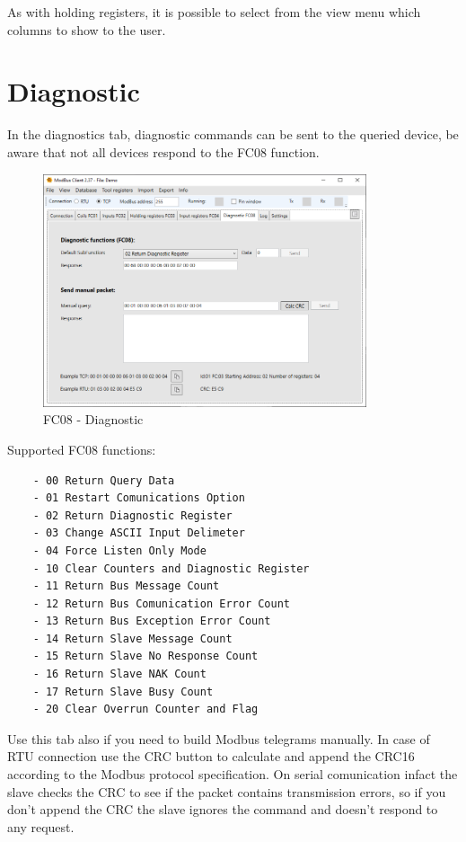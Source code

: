 As with holding registers, it is possible to select from the view menu 
which columns to show to the user.

\newpage
\section{Diagnostic}

In the diagnostics tab, diagnostic commands can be sent to the queried device, 
be aware
that not all devices respond to the FC08 function.

\begin{figure}[H]
\centering
\includegraphics[width=0.85\textwidth]{../Img/Modbus_Client_Diagnostic_00.PNG}
\caption{FC08 - Diagnostic}
\end{figure}

Supported FC08 functions:

\begin{verbatim}
    - 00 Return Query Data
    - 01 Restart Comunications Option
    - 02 Return Diagnostic Register
    - 03 Change ASCII Input Delimeter
    - 04 Force Listen Only Mode
    - 10 Clear Counters and Diagnostic Register
    - 11 Return Bus Message Count
    - 12 Return Bus Comunication Error Count
    - 13 Return Bus Exception Error Count
    - 14 Return Slave Message Count
    - 15 Return Slave No Response Count
    - 16 Return Slave NAK Count
    - 17 Return Slave Busy Count
    - 20 Clear Overrun Counter and Flag
\end{verbatim}

Use this tab also if you need to build Modbus telegrams manually.
In case of RTU connection use the CRC button to calculate and append the CRC16
according to the Modbus protocol specification. On serial comunication infact
the slave checks the CRC to see if the packet contains transmission errors,
so if you don't append the CRC the slave ignores the command and doesn't respond
to any request.
